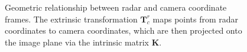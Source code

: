 \begin{figure}[t]
\caption{Geometric relationship between radar and camera coordinate frames. The extrinsic transformation $\mathbf{T}_{c}^{r}$ maps points from radar coordinates to camera coordinates, which are then projected onto the image plane via the intrinsic matrix $\mathbf{K}$.}
\label{fig:extrinsic_calibration}
\end{figure}
